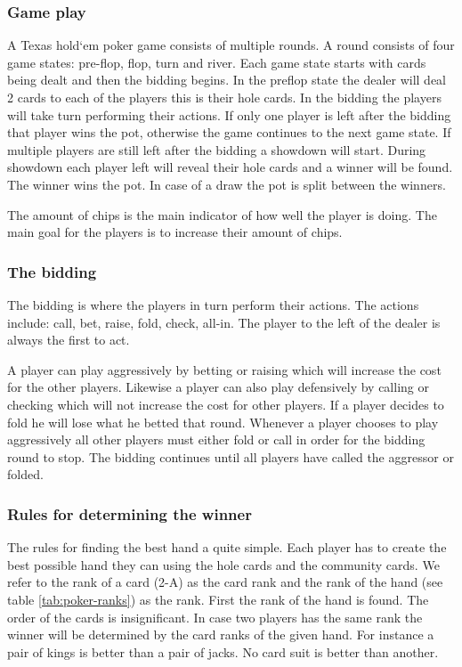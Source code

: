 \subsubsection*{Game play}
A Texas hold`em poker game consists of multiple rounds. A round consists of four game states: pre-flop, flop, turn and river. Each game state starts with cards being dealt and then the bidding begins. In the preflop state the dealer will deal 2 cards to each of the players this is their hole cards. In the bidding the players will take turn performing their actions. If only one player is left after the bidding that player wins the pot, otherwise the game continues to the next game state. If multiple players are still left after the bidding a showdown will start. During showdown each player left will reveal their hole cards and a winner will be found. The winner wins the pot. In case of a draw the pot is split between the winners.

The amount of chips is the main indicator of how well the player is doing. The main goal for the players is to increase their amount of chips.

\subsubsection*{The bidding}
The bidding is where the players in turn perform their actions. The actions include: call, bet, raise, fold, check, all-in. The player to the left of the dealer is always the first to act.

A player can play aggressively by betting or raising which will increase the cost for the other players. Likewise a player can also play defensively by calling or checking which will not increase the cost for other players. If a player decides to fold he will lose what he betted that round. Whenever a player chooses to play aggressively all other players must either fold or call in order for the bidding round to stop. The bidding continues until all players have called the aggressor or folded.

\subsubsection*{Rules for determining the winner}
The rules for finding the best hand a quite simple. Each player has to create the best possible hand they can using the hole cards and the community cards. We refer to the rank of a card (2-A) as the card rank and the rank of the hand (see table \ref{tab:poker-ranks}) as the rank. First the rank of the hand is found. The order of the cards is insignificant. In case two players has the same rank the winner will be determined by the card ranks of the given hand. For instance a pair of kings is better than a pair of jacks. No card suit is better than another. \\

